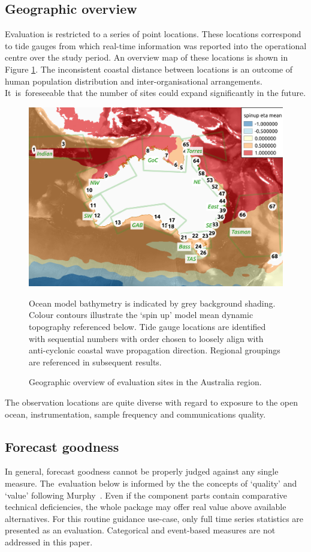 \subsection{Geographic overview}
Evaluation is restricted to a series of point locations.  These locations correspond to tide gauges from which real-time information was reported into the operational centre over the study period.  An overview map of these locations is shown in Figure \ref{fig:map_locations}.
The inconsistent coastal distance between locations is an outcome of human population distribution and inter-organisational arrangements.
It~is~foreseeable that the number of sites could expand significantly in the future.
\begin{figure}[!hbt] \centering
    \includegraphics[width=1.0\textwidth]{figures/maps/omaps_bathy_and_eta.png}
    \caption{Geographic overview of evaluation sites in the Australia region.}
    {Ocean model bathymetry is indicated by grey background shading.  Colour contours illustrate the `spin up' model mean dynamic topography referenced below.  Tide gauge locations are identified with sequential numbers with order chosen to loosely align with anti-cyclonic coastal wave propagation direction. Regional groupings are referenced in subsequent results.}
    \label{fig:map_locations}
\end{figure}  

The observation locations are quite diverse with regard to exposure to the open ocean, instrumentation, sample frequency and communications quality. 


\subsection{Forecast goodness}
In general, forecast goodness cannot be properly judged against any single measure.
The~evaluation below is informed by the the concepts of `quality' and `value' following Murphy~\citep{Murphy:1993dh}.
Even if the component parts contain comparative technical deficiencies, the whole package may offer real value above available alternatives.
For this routine guidance use-case, only full time series statistics are presented as an evaluation. 
Categorical and event-based measures are not addressed in this paper.


